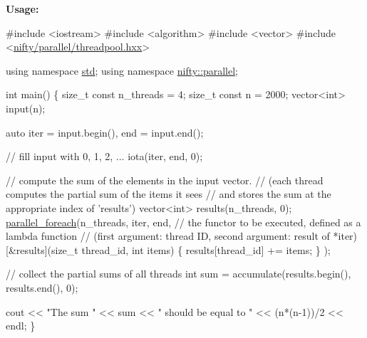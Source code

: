{\bfseries Usage\+:}


\begin{DoxyCode}
\textcolor{preprocessor}{#include <iostream>}
\textcolor{preprocessor}{#include <algorithm>}
\textcolor{preprocessor}{#include <vector>}
\textcolor{preprocessor}{#include <\hyperlink{threadpool_8hxx}{nifty/parallel/threadpool.hxx}>}

\textcolor{keyword}{using namespace }\hyperlink{namespacestd}{std};
\textcolor{keyword}{using namespace }\hyperlink{namespacenifty_1_1parallel}{nifty::parallel};

\textcolor{keywordtype}{int} main()
\{
    \textcolor{keywordtype}{size\_t} \textcolor{keyword}{const} n\_threads = 4;
    \textcolor{keywordtype}{size\_t} \textcolor{keyword}{const} n = 2000;
    vector<int> input(n);

    \textcolor{keyword}{auto} iter = input.begin(),
         end  = input.end();

    \textcolor{comment}{// fill input with 0, 1, 2, ...}
    iota(iter, end, 0);

    \textcolor{comment}{// compute the sum of the elements in the input vector.}
    \textcolor{comment}{// (each thread computes the partial sum of the items it sees}
    \textcolor{comment}{//  and stores the sum at the appropriate index of 'results')}
    vector<int> results(n\_threads, 0);
    \hyperlink{group__ParallelProcessing_ga505ac3d12ecde87341bce7b6f1027c88}{parallel\_foreach}(n\_threads, iter, end,
        \textcolor{comment}{// the functor to be executed, defined as a lambda function}
        \textcolor{comment}{// (first argument: thread ID, second argument: result of *iter)}
        [&results](\textcolor{keywordtype}{size\_t} thread\_id, \textcolor{keywordtype}{int} items)
        \{
            results[thread\_id] += items;
        \}
    );

    \textcolor{comment}{// collect the partial sums of all threads}
    \textcolor{keywordtype}{int} sum = accumulate(results.begin(), results.end(), 0);

    cout << \textcolor{stringliteral}{"The sum "} << sum << \textcolor{stringliteral}{" should be equal to "} << (n*(n-1))/2 << endl;
\}
\end{DoxyCode}
 \mbox{\label{group__ParallelProcessing_gae081bc77f03a070b9fe0f97966949f58}} 
